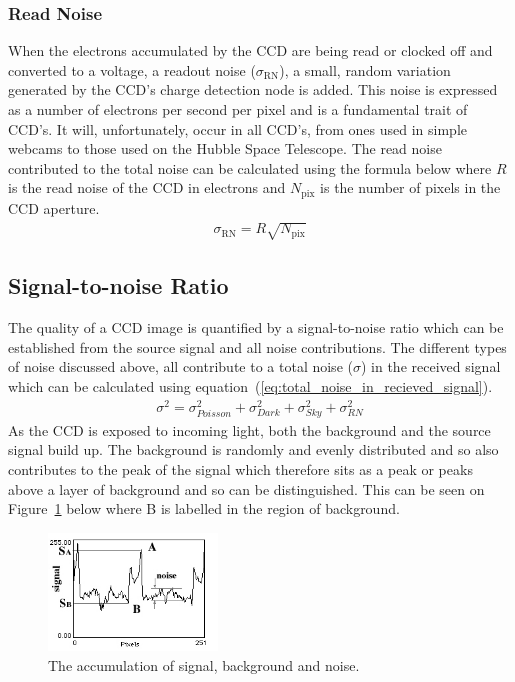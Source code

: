 		\subsubsection{Read Noise} %
		\label{ssub:read_noise}
			When the electrons accumulated by the CCD are being read or clocked off and converted to a voltage, a readout noise ($\sigma_\text{RN}$), a small, random variation generated by the CCD's charge detection node is added. This noise is expressed as a number of electrons per second per pixel and is a fundamental trait of CCD's. It will, unfortunately, occur in all CCD's, from ones used in simple webcams to those used on the Hubble Space Telescope\cite{Understanding_CCD_Read_Noise}. The read noise contributed to the total noise can be calculated using the formula below where $R$ is the read noise of the CCD in electrons and $N_\text{pix}$ is the number of pixels in the CCD aperture.
			\begin{align}
				\sigma_\text{RN} = R\sqrt{N_\text{pix}}
			\end{align}

	\subsection{Signal-to-noise Ratio} %
	\label{ssub:signal_to_noise_ratio}
		The quality of a CCD image is quantified by a signal-to-noise ratio which can be established from the source signal and all noise contributions. The different types of noise discussed above, all contribute to a total noise ($\sigma$) in the received signal which can be calculated using equation~(\ref{eq:total_noise_in_recieved_signal}).
		\begin{align}
			\sigma^{2} = \sigma_{Poisson}^{2} + \sigma_{Dark}^{2} + \sigma_{Sky}^{2} + \sigma_{RN}^{2} \label{eq:total_noise_in_recieved_signal}
		\end{align}
		As the CCD is exposed to incoming light, both the background and the source signal build up. The background is randomly and evenly distributed and so also contributes to the peak of the signal which therefore sits as a peak or peaks above a layer of background and so can be distinguished. This can be seen on Figure~\ref{fig:signal_noise_accumulation} below where B is labelled in the region of background\cite{Signal_to_Noise_Ratio}.
		\begin{figure}[htbp]
			\centering
			\includegraphics[width=0.4\textwidth]{../Images/SNR.png}
			\caption{The accumulation of signal, background and noise.\label{fig:signal_noise_accumulation}}
		\end{figure}

